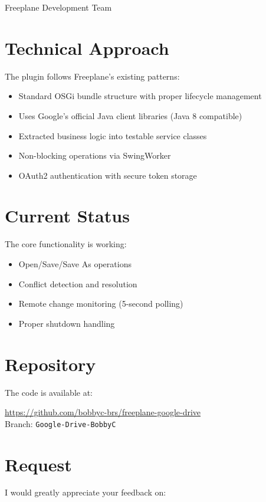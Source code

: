 \documentclass[11pt]{letter}
\begin{document}
\begin{letter}{Freeplane Development Team}
\section*{Technical Approach}

The plugin follows Freeplane's existing patterns:

\begin{itemize}[nosep]
    \item Standard OSGi bundle structure with proper lifecycle management
    \item Uses Google's official Java client libraries (Java 8 compatible)
    \item Extracted business logic into testable service classes
    \item Non-blocking operations via SwingWorker
    \item OAuth2 authentication with secure token storage
\end{itemize}

\section*{Current Status}

The core functionality is working:
\begin{itemize}[nosep]
    \item Open/Save/Save As operations
    \item Conflict detection and resolution
    \item Remote change monitoring (5-second polling)
    \item Proper shutdown handling
\end{itemize}

\section*{Repository}

The code is available at:

\begin{center}
\url{https://github.com/bobbyc-brs/freeplane-google-drive}\\
Branch: \texttt{Google-Drive-BobbyC}
\end{center}

\section*{Request}

I would greatly appreciate your feedback on:


\end{letter}
\end{document}
